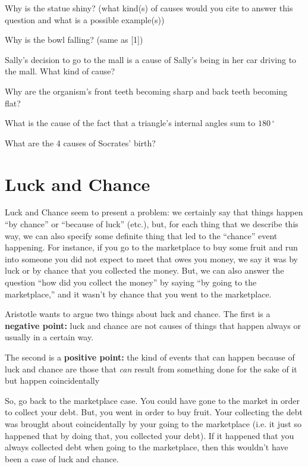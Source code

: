 \documentclass[oneside]{article}
\begin{document}
\noindent [1] Why is the statue shiny? (what kind(s) of causes would you cite to answer this question and what is a possible example(s))
\vspace*{3mm}

\noindent [2] Why is the bowl falling? (same as [1])
\vspace*{3mm}

\noindent [3] Sally's decision to go to the mall is a cause of Sally's being in her car driving to the mall. What kind of cause? 
\vspace*{3mm}

\noindent [4] Why are the organism's front teeth becoming sharp and back teeth becoming flat? 
\vspace*{3mm}

\noindent [5] What is the  cause of the fact that a triangle's internal angles sum to $180\,^{\circ}$
\vspace*{3mm}

\noindent [6] What are the 4 causes of Socrates' birth?

\section*{Luck and Chance}

\noindent Luck and Chance seem to present a problem: we certainly say that things happen ``by chance'' or ``because of luck'' (etc.), but, for each thing that we describe this way, we can also specify some definite thing that led to the ``chance'' event happening. For instance, if you go to the marketplace to buy some fruit and run into someone you did not expect to meet that owes you money, we say it was by luck or by chance that you collected the money. But, we can also answer the question ``how did you collect the money'' by saying ``by going to the marketplace,'' and it wasn't by chance that you went to the marketplace.
\vspace{2mm}

\noindent Aristotle wants to argue two things about luck and chance. The first is a \textbf{negative point:} luck and chance are not causes of things that happen always or usually in a certain way. 

\noindent The second is a \textbf{positive point:} the kind of events that can happen because of luck and chance are those that \emph{can}  result from something done for the sake of it but happen coincidentally

\noindent So, go back to the marketplace case. You could have gone to the market in order to collect your debt. But,  you went in order to buy fruit. Your collecting the debt was brought about coincidentally by your going to the marketplace (i.e. it just so happened that by doing that, you collected your debt). If it happened that you always collected debt when going to the marketplace, then this wouldn't have been a case of luck and chance. 

\end{document}
